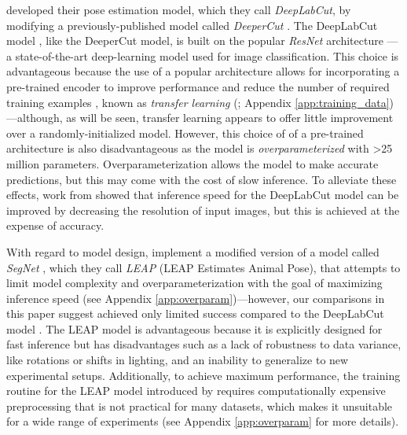 \documentclass[11pt,a4paper,oneside]{book}
\begin{document}
\cite{mathis2018deeplabcut} developed their pose estimation model, which they call \textit{DeepLabCut}, by modifying a previously-published model called \textit{DeeperCut} \citep{insafutdinov2016deepercut}. The DeepLabCut model \citep{mathis2018deeplabcut}, like the DeeperCut model, is built on the popular \textit{ResNet} architecture \citep{he2016deep}—a state-of-the-art deep-learning model used for image classification. This choice is advantageous because the use of a popular architecture allows for incorporating a pre-trained encoder to improve performance and reduce the number of required training examples \citep{mathis2018deeplabcut}, known as \textit{transfer learning} (\citealt{pratt1993discriminability}; Appendix \ref{app:training_data})---although, as will be seen, transfer learning appears to offer little improvement over a randomly-initialized model. However, this choice of of a pre-trained architecture is also disadvantageous as the model is \textit{overparameterized} with >25 million parameters. Overparameterization allows the model to make accurate predictions, but this may come with the cost of slow inference. To alleviate these effects, work from \cite{mathis2018inference} showed that inference speed for the DeepLabCut model \citep{mathis2018deeplabcut} can be improved by decreasing the resolution of input images, but this is achieved at the expense of accuracy. 

With regard to model design, \cite{pereira2019fast} implement a modified version of a model called \textit{SegNet} \citep{badrinarayanan2017segnet}, which they call \textit{LEAP} (LEAP Estimates Animal Pose), that attempts to limit model complexity and overparameterization with the goal of maximizing inference speed (see Appendix \ref{app:overparam})—however, our comparisons in this paper suggest \cite{pereira2019fast} achieved only limited success compared to the DeepLabCut model \citep{mathis2018deeplabcut}. The LEAP model is advantageous because it is explicitly designed for fast inference but has disadvantages such as a lack of robustness to data variance, like rotations or shifts in lighting, and an inability to generalize to new experimental setups. Additionally, to achieve maximum performance, the training routine for the LEAP model introduced by \cite{pereira2019fast} requires computationally expensive preprocessing that is not practical for many datasets, which makes it unsuitable for a wide range of experiments (see Appendix \ref{app:overparam} for more details).
\end{document}
